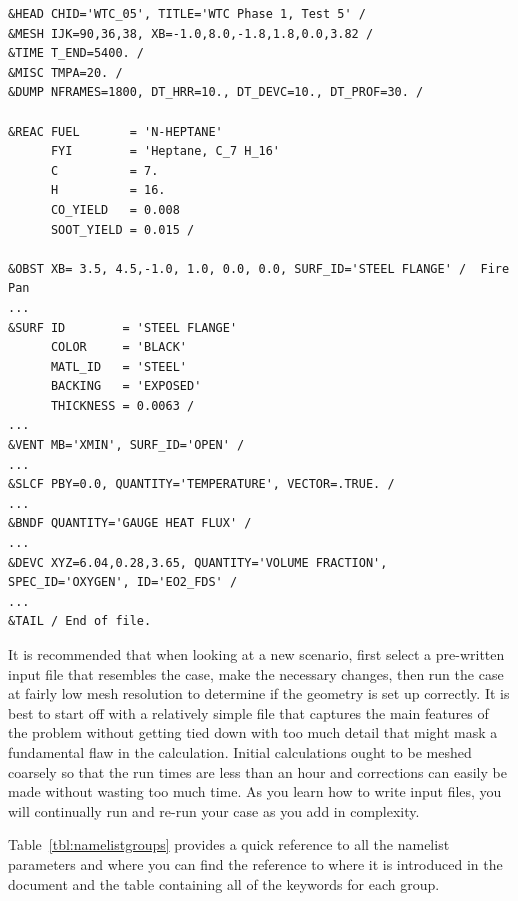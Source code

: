 \documentclass[11pt]{book}
\begin{document}
\begin{lstlisting}
&HEAD CHID='WTC_05', TITLE='WTC Phase 1, Test 5' /
&MESH IJK=90,36,38, XB=-1.0,8.0,-1.8,1.8,0.0,3.82 /
&TIME T_END=5400. /
&MISC TMPA=20. /
&DUMP NFRAMES=1800, DT_HRR=10., DT_DEVC=10., DT_PROF=30. /

&REAC FUEL       = 'N-HEPTANE'
      FYI        = 'Heptane, C_7 H_16'
      C          = 7.
      H          = 16.
      CO_YIELD   = 0.008
      SOOT_YIELD = 0.015 /

&OBST XB= 3.5, 4.5,-1.0, 1.0, 0.0, 0.0, SURF_ID='STEEL FLANGE' /  Fire Pan
...
&SURF ID        = 'STEEL FLANGE'
      COLOR     = 'BLACK'
      MATL_ID   = 'STEEL'
      BACKING   = 'EXPOSED'
      THICKNESS = 0.0063 /
...
&VENT MB='XMIN', SURF_ID='OPEN' /
...
&SLCF PBY=0.0, QUANTITY='TEMPERATURE', VECTOR=.TRUE. /
...
&BNDF QUANTITY='GAUGE HEAT FLUX' /
...
&DEVC XYZ=6.04,0.28,3.65, QUANTITY='VOLUME FRACTION', SPEC_ID='OXYGEN', ID='EO2_FDS' /
...
&TAIL / End of file.
\end{lstlisting}
It is recommended that when looking at a new scenario,
first select a pre-written input file that resembles the case,
make the necessary changes, then run the case at fairly low
mesh resolution to determine if the geometry is set up correctly.
It is best to start off with a relatively simple file that captures the main
features of the problem without getting tied down with too much detail that
might mask a fundamental flaw in the calculation. Initial calculations ought
to be meshed coarsely so that the run times are less than an hour and
corrections can easily be made without wasting too much time.
As you learn how to write input files, you will continually
run and re-run your case as you add in complexity.

Table~\ref{tbl:namelistgroups} provides a quick reference to all the namelist parameters and
where you can find the reference to where it is introduced in the document and the
table containing all of the keywords for each group.
\end{document}
